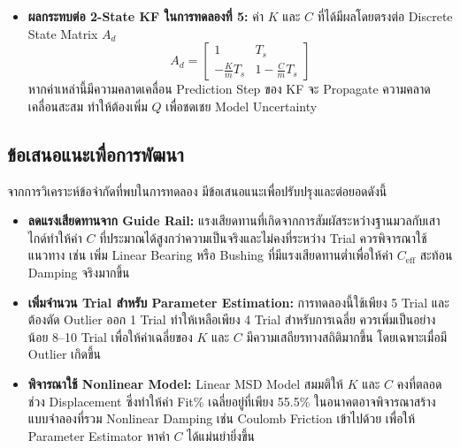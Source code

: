 \begin{itemize}
    \item \textbf{ผลกระทบต่อ 2-State KF ในการทดลองที่ 5:}
          ค่า $K$ และ $C$ ที่ได้มีผลโดยตรงต่อ Discrete State Matrix $A_d$
          \[
              A_d = \begin{bmatrix} 1 & T_s \\ -\frac{K}{m}T_s & 1-\frac{C}{m}T_s \end{bmatrix}
          \]
          หากค่าเหล่านี้มีความคลาดเคลื่อน Prediction Step ของ KF
          จะ Propagate ความคลาดเคลื่อนสะสม ทำให้ต้องเพิ่ม $Q$
          เพื่อชดเชย Model Uncertainty
\end{itemize}

\subsection{ข้อเสนอแนะเพื่อการพัฒนา}
 
จากการวิเคราะห์ข้อจำกัดที่พบในการทดลอง มีข้อเสนอแนะเพื่อปรับปรุงและต่อยอดดังนี้
 
\begin{itemize}
    \item \textbf{ลดแรงเสียดทานจาก Guide Rail:} แรงเสียดทานที่เกิดจากการสัมผัสระหว่างฐานมวลกับเสาไกด์ทำให้ค่า $C$ ที่ประมาณได้สูงกว่าความเป็นจริงและไม่คงที่ระหว่าง Trial ควรพิจารณาใช้แนวทาง เช่น เพิ่ม Linear Bearing หรือ Bushing ที่มีแรงเสียดทานต่ำเพื่อให้ค่า $C_{\text{eff}}$ สะท้อน Damping จริงมากขึ้น
    \item \textbf{เพิ่มจำนวน Trial สำหรับ Parameter Estimation:} การทดลองนี้ใช้เพียง 5 Trial และต้องตัด Outlier ออก 1 Trial ทำให้เหลือเพียง 4 Trial สำหรับการเฉลี่ย ควรเพิ่มเป็นอย่างน้อย 8--10 Trial เพื่อให้ค่าเฉลี่ยของ $K$ และ $C$ มีความเสถียรทางสถิติมากขึ้น โดยเฉพาะเมื่อมี Outlier เกิดขึ้น
    \item \textbf{พิจารณาใช้ Nonlinear Model:} Linear MSD Model สมมติให้ $K$ และ $C$ คงที่ตลอดช่วง Displacement ซึ่งทำให้ค่า Fit\% เฉลี่ยอยู่ที่เพียง 55.5\% ในอนาคตอาจพิจารณาสร้างแบบจำลองที่รวม Nonlinear Damping เช่น Coulomb Friction เข้าไปด้วย เพื่อให้ Parameter Estimator หาค่า $C$ ได้แม่นยำยิ่งขึ้น
\end{itemize}
 